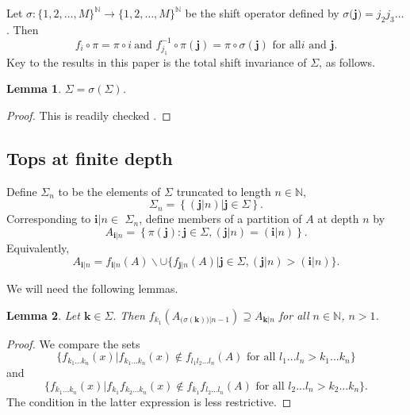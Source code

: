 \documentclass{amsproc}%
\theoremstyle{plain}
\newtheorem{lemma}{Lemma}
\theoremstyle{definition}
\numberwithin{equation}{section}
\begin{document}
Let $\sigma:\{1,2,\dots,M\}^{\mathbb{N}}\rightarrow\{1,2,\dots,M\}^{\mathbb{N}%
}$ be the shift operator defined by $\sigma(\mathbf{j)=}j_{2}j_{3}\dots$. Then%
\[
f_{i}\circ\pi=\pi\circ i\mathbf{\ }\text{and }f_{j_{1}}^{-1}\circ\pi\left(
\mathbf{j}\right)  =\pi\circ\sigma\left(  \mathbf{j}\right)  \text{ for all
}i\text{ and }\mathbf{j}.
\]
Key to the results in this paper is the total shift invariance of $\Sigma$, as follows.

\begin{lemma}
\label{proposition1}$\Sigma=\sigma\left(  \Sigma\right)  $.
\end{lemma}

\begin{proof}
This is readily checked \cite{BB}.
\end{proof}

\subsection{Tops at finite depth}

Define $\Sigma_{n}$ to be the elements of $\Sigma$ truncated to length
$n\in\mathbb{N}$,
\[
\Sigma_{n}=\left\{  \left(  \mathbf{j}|n\right)  |\mathbf{j}\in\Sigma\right\}
.
\]
Corresponding to $\mathbf{i}|n\in$ $\Sigma_{n}$, define members of a partition
of $A$ at depth $n$ by
\[
A_{\mathbf{i}|n}=\left\{  \pi(\mathbf{j}):\mathbf{j\in}\Sigma,\left(
\mathbf{j|}n\right)  =\left(  \mathbf{i|}n\right)  \right\}  .
\]
Equivalently,
\begin{equation}
A_{\mathbf{i}|n}=f_{\mathbf{i}|n}(A)\backslash\cup\{f_{\mathbf{j}%
|n}(A)|\mathbf{j\in}\Sigma,(\mathbf{j}|n)>(\mathbf{i}|n)\}.\label{coreydef}%
\end{equation}


We will need the following lemmas.

\begin{lemma}
\label{topshiftlemma}Let $\mathbf{k}\in\Sigma.$ Then $f_{k_{1}}\left(
A_{(\sigma\left(  \mathbf{k}\right)  \mathbf{)|}n-1}\right)  \supseteq
A_{\mathbf{k|}n}$ for all $n\in\mathbb{N}$, $n>1$.
\end{lemma}

\begin{proof}
We compare the sets
\[
\{f_{k_{1}...k_{n}}(x)|f_{k_{1}...k_{n}}(x)\notin f_{l_{1}l_{2}...l_{n}%
}(A)\text{ for all }l_{1}...l_{n}>k_{1}...k_{n}\}
\]
and
\[
\{f_{k_{1}...k_{n}}(x)|f_{k_{1}}f_{k_{2}...k_{n}}(x)\notin f_{k_{1}}%
f_{l_{2}...l_{n}}(A)\text{ for all }l_{2}...l_{n}>k_{2}...k_{n}\}.
\]
The condition in the latter expression is less restrictive.
\end{proof}
\end{document}
